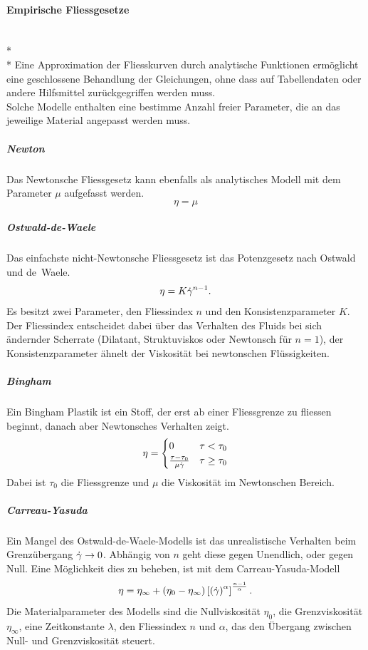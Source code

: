 \paragraph{Empirische Fliessgesetze}~\\*~\\*
Eine Approximation der Fliesskurven durch analytische Funktionen ermöglicht eine geschlossene Behandlung der Gleichungen, ohne dass auf Tabellendaten oder andere Hilfsmittel zurückgegriffen werden muss.\\
Solche Modelle enthalten eine bestimme Anzahl freier Parameter, die an das jeweilige Material angepasst werden muss.
\subparagraph{Newton}
Das Newtonsche Fliessgesetz kann ebenfalls als analytisches Modell mit dem Parameter $\mu$ aufgefasst werden.
\begin{equation}
    \eta = \mu
    \label{eq:fg:newton}
\end{equation}
\subparagraph{Ostwald-de-Waele}
Das einfachste nicht-Newtonsche Fliessgesetz ist das Potenzgesetz nach Ostwald und de~Waele.
\begin{equation}
    \eta=K\dot\gamma^{n-1}.
    \label{eq:fg:potenz}
\end{equation}
 Es besitzt zwei Parameter, den Fliessindex $n$ und den Konsistenzparameter $K$. Der Fliessindex entscheidet dabei über das Verhalten des Fluids bei sich ändernder Scherrate (Dilatant, Struktuviskos oder Newtonsch für $n=1$), der Konsistenzparameter ähnelt der Viskosität bei newtonschen Flüssigkeiten.
\subparagraph{Bingham}
Ein Bingham Plastik ist ein Stoff, der erst ab einer Fliessgrenze zu fliessen beginnt, danach aber Newtonsches Verhalten zeigt.
\begin{equation}
    \eta=
    \begin{cases}
        0                                & \tau<\tau_{0}    \\
        \frac{\tau-\tau_{0}}{\mu\dot\gamma} & \tau\geq\tau_{0}
    \end{cases}
    \label{eq:fg:bingham}
\end{equation}
Dabei ist $\tau_0$ die Fliessgrenze und $\mu$ die Viskosität im Newtonschen Bereich.
\subparagraph{Carreau-Yasuda}
Ein Mangel des Ostwald-de-Waele-Modells ist das unrealistische Verhalten beim Grenzübergang $\dot\gamma\rightarrow 0$. Abhängig von $n$ geht diese gegen Unendlich, oder gegen Null.
Eine Möglichkeit dies zu beheben, ist mit dem Carreau-Yasuda-Modell
\begin{equation}
    \eta=\eta_\infty+\left( \eta_0-\eta_\infty \right)\left[ \left( \dot\gamma \right)^\alpha \right] ^{\frac{n-1}{\alpha}}.
    \label{eq:fg:carreauyasuda}
\end{equation}
Die Materialparameter des Modells sind die Nullviskosität $\eta_0$, die Grenzviskosität $\eta_\infty$, eine Zeitkonstante $\lambda$, den Fliessindex $n$ und $\alpha$, das den Übergang zwischen Null- und Grenzviskosität steuert.

